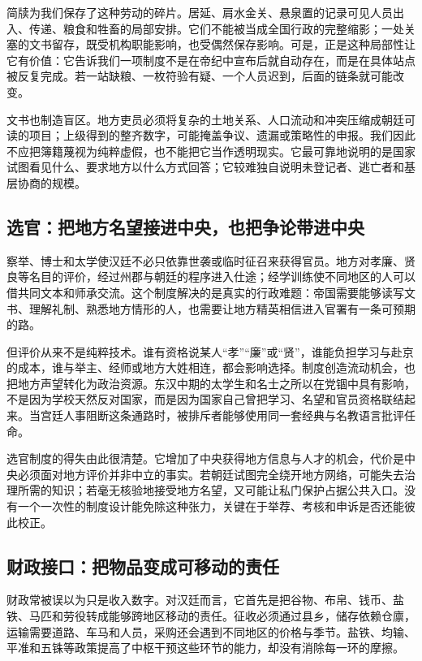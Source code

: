 简牍为我们保存了这种劳动的碎片。居延、肩水金关、悬泉置的记录可见人员出入、传递、粮食和牲畜的局部安排。它们不能被当成全国行政的完整缩影；一处关塞的文书留存，既受机构职能影响，也受偶然保存影响。可是，正是这种局部性让它有价值：它告诉我们一项制度不是在帝纪中宣布后就自动存在，而是在具体站点被反复完成。若一站缺粮、一枚符验有疑、一个人员迟到，后面的链条就可能改变。

文书也制造盲区。地方吏员必须将复杂的土地关系、人口流动和冲突压缩成朝廷可读的项目；上级得到的整齐数字，可能掩盖争议、遗漏或策略性的申报。我们因此不应把簿籍蔑视为纯粹虚假，也不能把它当作透明现实。它最可靠地说明的是国家试图看见什么、要求地方以什么方式回答；它较难独自说明未登记者、逃亡者和基层协商的规模。

\subsection{选官：把地方名望接进中央，也把争论带进中央}

察举、博士和太学使汉廷不必只依靠世袭或临时征召来获得官员。地方对孝廉、贤良等名目的评价，经过州郡与朝廷的程序进入仕途；经学训练使不同地区的人可以借共同文本和师承交流。这个制度解决的是真实的行政难题：帝国需要能够读写文书、理解礼制、熟悉地方情形的人，也需要让地方精英相信进入官署有一条可预期的路。

但评价从来不是纯粹技术。谁有资格说某人“孝”“廉”或“贤”，谁能负担学习与赴京的成本，谁与举主、经师或地方大姓相连，都会影响选择。制度创造流动机会，也把地方声望转化为政治资源。东汉中期的太学生和名士之所以在党锢中具有影响，不是因为学校天然反对国家，而是因为国家自己曾把学习、名望和官员资格联结起来。当宫廷人事阻断这条通路时，被排斥者能够使用同一套经典与名教语言批评任命。

选官制度的得失由此很清楚。它增加了中央获得地方信息与人才的机会，代价是中央必须面对地方评价并非中立的事实。若朝廷试图完全绕开地方网络，可能失去治理所需的知识；若毫无核验地接受地方名望，又可能让私门保护占据公共入口。没有一个一次性的制度设计能免除这种张力，关键在于举荐、考核和申诉是否还能彼此校正。

\subsection{财政接口：把物品变成可移动的责任}

财政常被误以为只是收入数字。对汉廷而言，它首先是把谷物、布帛、钱币、盐铁、马匹和劳役转成能够跨地区移动的责任。征收必须通过县乡，储存依赖仓廪，运输需要道路、车马和人员，采购还会遇到不同地区的价格与季节。盐铁、均输、平准和五铢等政策提高了中枢干预这些环节的能力，却没有消除每一环的摩擦。

